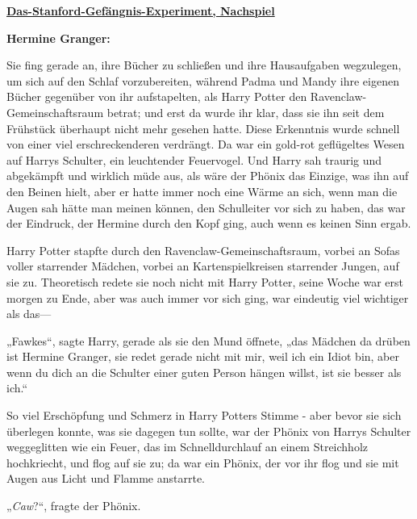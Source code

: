 

\hypertarget{das-stanford-gefuxe4ngnis-experiment-nachspiel}{%

\textbf{\uline{Das-Stanford-Gefängnis-Experiment, Nachspiel}}

\textbf{Hermine Granger:}

Sie fing gerade an, ihre Bücher zu schließen und ihre Hausaufgaben wegzulegen, um sich auf den Schlaf vorzubereiten, während Padma und Mandy ihre eigenen Bücher gegenüber von ihr aufstapelten, als Harry Potter den Ravenclaw-Gemeinschaftsraum betrat; und erst da wurde ihr klar, dass sie ihn seit dem Frühstück überhaupt nicht mehr gesehen hatte. Diese Erkenntnis wurde schnell von einer viel erschreckenderen verdrängt. Da war ein gold-rot geflügeltes Wesen auf Harrys Schulter, ein leuchtender Feuervogel. Und Harry sah traurig und abgekämpft und wirklich müde aus, als wäre der Phönix das Einzige, was ihn auf den Beinen hielt, aber er hatte immer noch eine Wärme an sich, wenn man die Augen sah hätte man meinen können, den Schulleiter vor sich zu haben, das war der Eindruck, der Hermine durch den Kopf ging, auch wenn es keinen Sinn ergab.

Harry Potter stapfte durch den Ravenclaw-Gemeinschaftsraum, vorbei an Sofas voller starrender Mädchen, vorbei an Kartenspielkreisen starrender Jungen, auf sie zu. Theoretisch redete sie noch nicht mit Harry Potter, seine Woche war erst morgen zu Ende, aber was auch immer vor sich ging, war eindeutig viel wichtiger als das—

„Fawkes“, sagte Harry, gerade als sie den Mund öffnete, „das Mädchen da drüben ist Hermine Granger, sie redet gerade nicht mit mir, weil ich ein Idiot bin, aber wenn du dich an die Schulter einer guten Person hängen willst, ist sie besser als ich.“

So viel Erschöpfung und Schmerz in Harry Potters Stimme - aber bevor sie sich überlegen konnte, was sie dagegen tun sollte, war der Phönix von Harrys Schulter weggeglitten wie ein Feuer, das im Schnelldurchlauf an einem Streichholz hochkriecht, und flog auf sie zu; da war ein Phönix, der vor ihr flog und sie mit Augen aus Licht und Flamme anstarrte.

„\emph{Caw}?“, fragte der Phönix.

}
